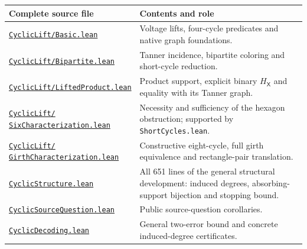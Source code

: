 \documentclass[11pt]{article}
\theoremstyle{definition}
\theoremstyle{remark}
\begin{document}
\begin{table}[htbp]
\centering\small
\begin{tabular}{P{.38\linewidth}P{.55\linewidth}}
\toprule
Complete source file & Contents and role \\
\midrule
\href{https://github.com/alectionary/vibe-math/blob/5dbda826fb9d385cf5528694f6908d28bc94054d/formalization/dyadic-rank/CyclicLift/Basic.lean}{\texttt{CyclicLift/Basic.lean}} & Voltage lifts, four-cycle predicates and native graph foundations. \\
\href{https://github.com/alectionary/vibe-math/blob/5dbda826fb9d385cf5528694f6908d28bc94054d/formalization/dyadic-rank/CyclicLift/Bipartite.lean}{\texttt{CyclicLift/Bipartite.lean}} & Tanner incidence, bipartite coloring and short-cycle reduction. \\
\href{https://github.com/alectionary/vibe-math/blob/5dbda826fb9d385cf5528694f6908d28bc94054d/formalization/dyadic-rank/CyclicLift/LiftedProduct.lean}{\texttt{CyclicLift/LiftedProduct.lean}} & Product support, explicit binary $H_{\mathsf X}$ and equality with its Tanner graph. \\
\href{https://github.com/alectionary/vibe-math/blob/5dbda826fb9d385cf5528694f6908d28bc94054d/formalization/dyadic-rank/CyclicLift/SixCharacterization.lean}{\texttt{CyclicLift/}\newline\texttt{SixCharacterization.lean}} & Necessity and sufficiency of the hexagon obstruction; supported by \texttt{ShortCycles.lean}. \\
\href{https://github.com/alectionary/vibe-math/blob/5dbda826fb9d385cf5528694f6908d28bc94054d/formalization/dyadic-rank/CyclicLift/GirthCharacterization.lean}{\texttt{CyclicLift/}\newline\texttt{GirthCharacterization.lean}} & Constructive eight-cycle, full girth equivalence and rectangle-pair translation. \\
\href{https://github.com/alectionary/vibe-math/blob/5dbda826fb9d385cf5528694f6908d28bc94054d/formalization/dyadic-rank/CyclicStructure.lean}{\texttt{CyclicStructure.lean}} & All 651 lines of the general structural development: induced degrees, absorbing-support bijection and stopping bound. \\
\href{https://github.com/alectionary/vibe-math/blob/5dbda826fb9d385cf5528694f6908d28bc94054d/formalization/dyadic-rank/CyclicSourceQuestion.lean}{\texttt{CyclicSourceQuestion.lean}} & Public source-question corollaries. \\
\href{https://github.com/alectionary/vibe-math/blob/5dbda826fb9d385cf5528694f6908d28bc94054d/formalization/dyadic-rank/CyclicDecoding.lean}{\texttt{CyclicDecoding.lean}} & General two-error bound and concrete induced-degree certificates. \\

\end{tabular}
\end{table}
\end{document}
